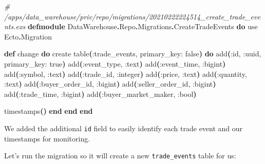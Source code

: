 \documentclass[
  oneside]{book}
\newenvironment{Shaded}{\begin{snugshade}}{\end{snugshade}}
\newcommand{\CommentTok}[1]{\textcolor[rgb]{0.56,0.35,0.01}{\textit{#1}}}
\newcommand{\ConstantTok}[1]{\textcolor[rgb]{0.56,0.35,0.01}{#1}}
\newcommand{\FunctionTok}[1]{\textcolor[rgb]{0.13,0.29,0.53}{\textbf{#1}}}
\newcommand{\ImportTok}[1]{#1}
\newcommand{\KeywordTok}[1]{\textcolor[rgb]{0.13,0.29,0.53}{\textbf{#1}}}
\newcommand{\NormalTok}[1]{#1}
\newcommand{\OperatorTok}[1]{\textcolor[rgb]{0.81,0.36,0.00}{\textbf{#1}}}
\newcommand{\VariableTok}[1]{\textcolor[rgb]{0.00,0.00,0.00}{#1}}
\begin{document}
\begin{Shaded}
\begin{Highlighting}[]
\CommentTok{\# /apps/data\_warehouse/priv/repo/migrations/20210222224514\_create\_trade\_events.exs}
\KeywordTok{defmodule} \ConstantTok{DataWarehouse}\OperatorTok{.}\ConstantTok{Repo}\OperatorTok{.}\ConstantTok{Migrations}\OperatorTok{.}\ConstantTok{CreateTradeEvents} \KeywordTok{do}
  \ImportTok{use} \ConstantTok{Ecto}\OperatorTok{.}\ConstantTok{Migration}

  \KeywordTok{def}\NormalTok{ change }\KeywordTok{do}
\NormalTok{    create table}\FunctionTok{(}\VariableTok{:trade\_events}\NormalTok{, }\VariableTok{primary\_key:} \ConstantTok{false}\FunctionTok{)} \KeywordTok{do}
\NormalTok{      add}\FunctionTok{(}\VariableTok{:id}\NormalTok{, }\VariableTok{:uuid}\NormalTok{, }\VariableTok{primary\_key:} \ConstantTok{true}\FunctionTok{)}
\NormalTok{      add}\FunctionTok{(}\VariableTok{:event\_type}\NormalTok{, }\VariableTok{:text}\FunctionTok{)}
\NormalTok{      add}\FunctionTok{(}\VariableTok{:event\_time}\NormalTok{, }\VariableTok{:bigint}\FunctionTok{)}
\NormalTok{      add}\FunctionTok{(}\VariableTok{:symbol}\NormalTok{, }\VariableTok{:text}\FunctionTok{)}
\NormalTok{      add}\FunctionTok{(}\VariableTok{:trade\_id}\NormalTok{, }\VariableTok{:integer}\FunctionTok{)}
\NormalTok{      add}\FunctionTok{(}\VariableTok{:price}\NormalTok{, }\VariableTok{:text}\FunctionTok{)}
\NormalTok{      add}\FunctionTok{(}\VariableTok{:quantity}\NormalTok{, }\VariableTok{:text}\FunctionTok{)}
\NormalTok{      add}\FunctionTok{(}\VariableTok{:buyer\_order\_id}\NormalTok{, }\VariableTok{:bigint}\FunctionTok{)}
\NormalTok{      add}\FunctionTok{(}\VariableTok{:seller\_order\_id}\NormalTok{, }\VariableTok{:bigint}\FunctionTok{)}
\NormalTok{      add}\FunctionTok{(}\VariableTok{:trade\_time}\NormalTok{, }\VariableTok{:bigint}\FunctionTok{)}
\NormalTok{      add}\FunctionTok{(}\VariableTok{:buyer\_market\_maker}\NormalTok{, }\VariableTok{:bool}\FunctionTok{)}

\NormalTok{      timestamps}\FunctionTok{()}
    \KeywordTok{end}
  \KeywordTok{end}
\KeywordTok{end}
\end{Highlighting}
\end{Shaded}

We added the additional \texttt{id} field to easily identify each trade event and our timestamps for monitoring.

Let's run the migration so it will create a new \texttt{trade\_events} table for us:
\end{document}
